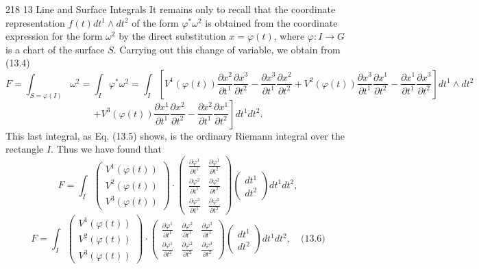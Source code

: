 218
13 Line and Surface Integrals
It remains only to recall that the coordinate representation $f(t) dt^1 \wedge dt^2$ of the
form $\varphi^*\omega^2$ is obtained from the coordinate expression for the form $\omega^2$ by the direct
substitution $x = \varphi(t)$, where $\varphi : I \to G$ is a chart of the surface $S$.
Carrying out this change of variable, we obtain from (13.4)
$$ F = \int_{S=\varphi(I)} \omega^2 = \int_I \varphi^*\omega^2 = \int_I \left[ V^1(\varphi(t)) \frac{\partial x^2}{\partial t^1} \frac{\partial x^3}{\partial t^2} - \frac{\partial x^3}{\partial t^1} \frac{\partial x^2}{\partial t^2} + V^2(\varphi(t)) \frac{\partial x^3}{\partial t^1} \frac{\partial x^1}{\partial t^2} - \frac{\partial x^1}{\partial t^1} \frac{\partial x^3}{\partial t^2} \right] dt^1 \wedge dt^2 $$
$$ \left. + V^3(\varphi(t)) \frac{\partial x^1}{\partial t^1} \frac{\partial x^2}{\partial t^2} - \frac{\partial x^2}{\partial t^1} \frac{\partial x^1}{\partial t^2} \right] dt^1 dt^2. $$
This last integral, as Eq. (13.5) shows, is the ordinary Riemann integral over the
rectangle $I$.
Thus we have found that
$$ F = \int_I \begin{pmatrix} V^1(\varphi(t)) \\ V^2(\varphi(t)) \\ V^3(\varphi(t)) \end{pmatrix} \cdot \begin{pmatrix} \frac{\partial \varphi^1}{\partial t^1} & \frac{\partial \varphi^1}{\partial t^2} \\ \frac{\partial \varphi^2}{\partial t^1} & \frac{\partial \varphi^2}{\partial t^2} \\ \frac{\partial \varphi^3}{\partial t^1} & \frac{\partial \varphi^3}{\partial t^2} \end{pmatrix} \begin{pmatrix} dt^1 \\ dt^2 \end{pmatrix} dt^1 dt^2, $$
$$ F = \int_I \begin{pmatrix} V^1(\varphi(t)) \\ V^2(\varphi(t)) \\ V^3(\varphi(t)) \end{pmatrix} \cdot \begin{pmatrix} \frac{\partial \varphi^1}{\partial t^1} & \frac{\partial \varphi^2}{\partial t^1} & \frac{\partial \varphi^3}{\partial t^1} \\ \frac{\partial \varphi^1}{\partial t^2} & \frac{\partial \varphi^2}{\partial t^2} & \frac{\partial \varphi^3}{\partial t^2} \end{pmatrix} \begin{pmatrix} dt^1 \\ dt^2 \end{pmatrix} dt^1 dt^2, \quad \text{(13.6)} $$

